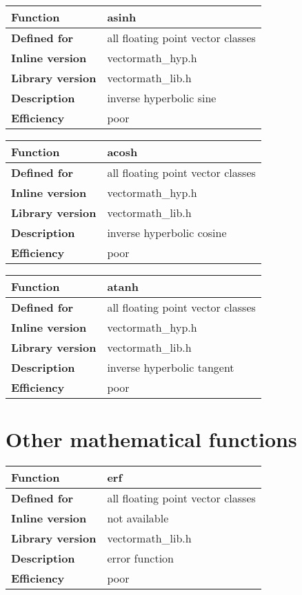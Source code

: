 \documentclass[vcl_manual.tex]{subfiles}
\begin{document}
\begin{tabular}{|p{30mm}|p{120mm}|}
\hline
\bfseries Function & asinh \\ \hline
\bfseries Defined for & all floating point vector classes \\ \hline
\bfseries Inline version & vectormath\_hyp.h \\ \hline
\bfseries Library version & vectormath\_lib.h \\ \hline
\bfseries Description & inverse hyperbolic sine \\ \hline
\bfseries Efficiency & poor \\ \hline
\end{tabular}


\begin{tabular}{|p{30mm}|p{120mm}|}
\hline
\bfseries Function & acosh \\ \hline
\bfseries Defined for & all floating point vector classes \\ \hline
\bfseries Inline version & vectormath\_hyp.h \\ \hline
\bfseries Library version & vectormath\_lib.h \\ \hline
\bfseries Description & inverse hyperbolic cosine \\ \hline
\bfseries Efficiency & poor \\ \hline
\end{tabular}


\begin{tabular}{|p{30mm}|p{120mm}|}
\hline
\bfseries Function & atanh \\ \hline
\bfseries Defined for & all floating point vector classes \\ \hline
\bfseries Inline version & vectormath\_hyp.h \\ \hline
\bfseries Library version & vectormath\_lib.h \\ \hline
\bfseries Description & inverse hyperbolic tangent \\ \hline
\bfseries Efficiency & poor \\ \hline
\end{tabular}


\section{Other mathematical functions}\label{OtherMathematicalFunctions}

\begin{tabular}{|p{30mm}|p{120mm}|}
\hline
\bfseries Function & erf \\ \hline
\bfseries Defined for & all floating point vector classes \\ \hline
\bfseries Inline version & not available \\ \hline
\bfseries Library version & vectormath\_lib.h \\ \hline
\bfseries Description & error function \\ \hline
\bfseries Efficiency & poor \\ \hline
\end{tabular}
\end{document}
